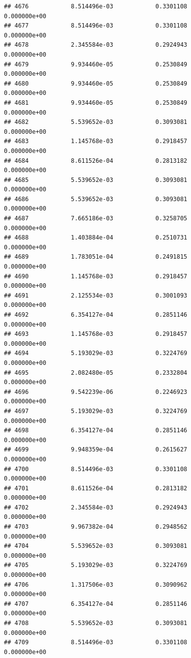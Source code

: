 \documentclass[
]{article}
\begin{document}
\begin{verbatim}
## 4676            8.514496e-03            0.3301108            0.000000e+00
## 4677            8.514496e-03            0.3301108            0.000000e+00
## 4678            2.345584e-03            0.2924943            0.000000e+00
## 4679            9.934460e-05            0.2530849            0.000000e+00
## 4680            9.934460e-05            0.2530849            0.000000e+00
## 4681            9.934460e-05            0.2530849            0.000000e+00
## 4682            5.539652e-03            0.3093081            0.000000e+00
## 4683            1.145768e-03            0.2918457            0.000000e+00
## 4684            8.611526e-04            0.2813182            0.000000e+00
## 4685            5.539652e-03            0.3093081            0.000000e+00
## 4686            5.539652e-03            0.3093081            0.000000e+00
## 4687            7.665186e-03            0.3258705            0.000000e+00
## 4688            1.403884e-04            0.2510731            0.000000e+00
## 4689            1.783051e-04            0.2491815            0.000000e+00
## 4690            1.145768e-03            0.2918457            0.000000e+00
## 4691            2.125534e-03            0.3001093            0.000000e+00
## 4692            6.354127e-04            0.2851146            0.000000e+00
## 4693            1.145768e-03            0.2918457            0.000000e+00
## 4694            5.193029e-03            0.3224769            0.000000e+00
## 4695            2.082480e-05            0.2332804            0.000000e+00
## 4696            9.542239e-06            0.2246923            0.000000e+00
## 4697            5.193029e-03            0.3224769            0.000000e+00
## 4698            6.354127e-04            0.2851146            0.000000e+00
## 4699            9.948359e-04            0.2615627            0.000000e+00
## 4700            8.514496e-03            0.3301108            0.000000e+00
## 4701            8.611526e-04            0.2813182            0.000000e+00
## 4702            2.345584e-03            0.2924943            0.000000e+00
## 4703            9.967382e-04            0.2948562            0.000000e+00
## 4704            5.539652e-03            0.3093081            0.000000e+00
## 4705            5.193029e-03            0.3224769            0.000000e+00
## 4706            1.317506e-03            0.3090962            0.000000e+00
## 4707            6.354127e-04            0.2851146            0.000000e+00
## 4708            5.539652e-03            0.3093081            0.000000e+00
## 4709            8.514496e-03            0.3301108            0.000000e+00

\end{verbatim}
\end{document}
